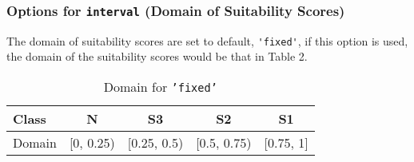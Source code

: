 \documentclass[11pt,fleqn]{article}\usepackage[]{graphicx}\usepackage[]{color}
\begin{document}
\subsubsection*{Options for \texttt{interval} (Domain of Suitability Scores)}
The domain of suitability scores are set to default, \verb|'fixed'|, if this option is used, the domain of the suitability scores would be that in Table 2.
\begin{table}[h]
\begin{tabular}{lcccc}
\toprule
Class&N&S3&S2&S1\\
\midrule
Domain&[0, 0.25)&[0.25, 0.5)&[0.5, 0.75)&[0.75, 1]\\
\bottomrule
\end{tabular}
\caption{Domain for \texttt{'fixed'}}
\label{tab:dfixed}
\end{table}
\end{document}
